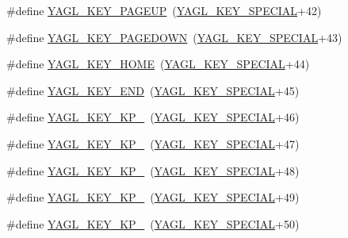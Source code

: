 \begin{DoxyCompactItemize}
\item 
\#define \hyperlink{group____consts__key__mouse_ga5a84236a21b38e91f1e6c833d1c51e68}{Y\-A\-G\-L\-\_\-\-K\-E\-Y\-\_\-\-P\-A\-G\-E\-U\-P}~(\hyperlink{group____consts__key__mouse_gae6060c5e0a8f15c67d28e1a1f0765d7b}{Y\-A\-G\-L\-\_\-\-K\-E\-Y\-\_\-\-S\-P\-E\-C\-I\-A\-L}+42)
\item 
\#define \hyperlink{group____consts__key__mouse_ga6de88512bfa61f94d174192ff5dcd7f8}{Y\-A\-G\-L\-\_\-\-K\-E\-Y\-\_\-\-P\-A\-G\-E\-D\-O\-W\-N}~(\hyperlink{group____consts__key__mouse_gae6060c5e0a8f15c67d28e1a1f0765d7b}{Y\-A\-G\-L\-\_\-\-K\-E\-Y\-\_\-\-S\-P\-E\-C\-I\-A\-L}+43)
\item 
\#define \hyperlink{group____consts__key__mouse_ga1dc399f659b9a3e7fc715979e7bcd33e}{Y\-A\-G\-L\-\_\-\-K\-E\-Y\-\_\-\-H\-O\-M\-E}~(\hyperlink{group____consts__key__mouse_gae6060c5e0a8f15c67d28e1a1f0765d7b}{Y\-A\-G\-L\-\_\-\-K\-E\-Y\-\_\-\-S\-P\-E\-C\-I\-A\-L}+44)
\item 
\#define \hyperlink{group____consts__key__mouse_ga4d9f61bdfa00bea61654bef1e273bb8e}{Y\-A\-G\-L\-\_\-\-K\-E\-Y\-\_\-\-E\-N\-D}~(\hyperlink{group____consts__key__mouse_gae6060c5e0a8f15c67d28e1a1f0765d7b}{Y\-A\-G\-L\-\_\-\-K\-E\-Y\-\_\-\-S\-P\-E\-C\-I\-A\-L}+45)
\item 
\#define \hyperlink{group____consts__key__mouse_gaf554b6f063a2751b59a8337b4b6086ef}{Y\-A\-G\-L\-\_\-\-K\-E\-Y\-\_\-\-K\-P\-\_}~(\hyperlink{group____consts__key__mouse_gae6060c5e0a8f15c67d28e1a1f0765d7b}{Y\-A\-G\-L\-\_\-\-K\-E\-Y\-\_\-\-S\-P\-E\-C\-I\-A\-L}+46)
\item 
\#define \hyperlink{group____consts__key__mouse_ga3053c31ae59ba0f5ef67eb55d9f33ed7}{Y\-A\-G\-L\-\_\-\-K\-E\-Y\-\_\-\-K\-P\-\_}~(\hyperlink{group____consts__key__mouse_gae6060c5e0a8f15c67d28e1a1f0765d7b}{Y\-A\-G\-L\-\_\-\-K\-E\-Y\-\_\-\-S\-P\-E\-C\-I\-A\-L}+47)
\item 
\#define \hyperlink{group____consts__key__mouse_gaabe2206538dfe1663a74979182af83e5}{Y\-A\-G\-L\-\_\-\-K\-E\-Y\-\_\-\-K\-P\-\_}~(\hyperlink{group____consts__key__mouse_gae6060c5e0a8f15c67d28e1a1f0765d7b}{Y\-A\-G\-L\-\_\-\-K\-E\-Y\-\_\-\-S\-P\-E\-C\-I\-A\-L}+48)
\item 
\#define \hyperlink{group____consts__key__mouse_gad2ccd03d7cef5b791436a7d00ac5471c}{Y\-A\-G\-L\-\_\-\-K\-E\-Y\-\_\-\-K\-P\-\_}~(\hyperlink{group____consts__key__mouse_gae6060c5e0a8f15c67d28e1a1f0765d7b}{Y\-A\-G\-L\-\_\-\-K\-E\-Y\-\_\-\-S\-P\-E\-C\-I\-A\-L}+49)
\item 
\#define \hyperlink{group____consts__key__mouse_ga97c04c328f767e0ba123b185920b61b0}{Y\-A\-G\-L\-\_\-\-K\-E\-Y\-\_\-\-K\-P\-\_}~(\hyperlink{group____consts__key__mouse_gae6060c5e0a8f15c67d28e1a1f0765d7b}{Y\-A\-G\-L\-\_\-\-K\-E\-Y\-\_\-\-S\-P\-E\-C\-I\-A\-L}+50)

\end{DoxyCompactItemize}
